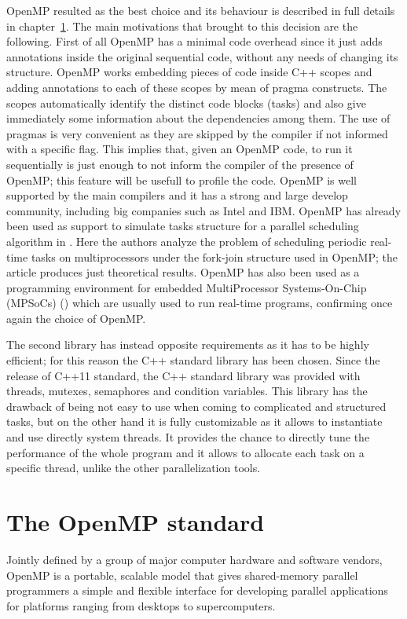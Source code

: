 \documentclass[a4paper,12pt,oneside]{book}
\begin{document}
OpenMP resulted as the best choice and its behaviour is described in full details in chapter~\ref{openmp}. The main motivations that brought to this decision are the following. First of all  OpenMP has a minimal code overhead since it just adds annotations inside the original sequential code, without any needs of changing its structure.  OpenMP works embedding pieces of code inside C++ scopes and adding annotations to each of these scopes by mean of pragma constructs. The scopes automatically identify the distinct code blocks (tasks) and also give immediately some information about the dependencies among them. The use of pragmas is very convenient as they are skipped by the compiler if not informed with a specific flag. This implies that, given an  OpenMP code, to run it sequentially is just enough to not inform the compiler of the presence of  OpenMP; this feature will be usefull to profile the code.  OpenMP is well supported by the main compilers and it has a strong and large develop community, including big companies such as Intel and IBM. OpenMP has already been used as support to simulate tasks structure for a parallel scheduling algorithm in \cite{realtimeopenmp}. Here the authors analyze the problem of scheduling periodic real-time tasks on multiprocessors under the fork-join structure used in OpenMP; the article produces just theoretical results. OpenMP has also been used as a programming environment for embedded MultiProcessor Systems-On-Chip (MPSoCs) (\cite{benini}) which are usually used to run real-time programs, confirming once again the choice of OpenMP. 

The second library has instead opposite requirements as it has to be highly efficient; for this reason the C++ standard library has been chosen. Since the release of C++11 standard, the C++ standard library was provided with threads, mutexes, semaphores and condition variables. This library has the drawback of being not easy to use when coming to complicated and structured tasks, but on the other hand it is fully customizable as it allows to instantiate and use directly system threads. It provides the chance to directly tune the performance of the whole program and it allows to allocate each task on a specific thread, unlike the other parallelization tools.

\section{The OpenMP standard}
\label{openmp}

Jointly defined by a group of major computer hardware and software vendors, OpenMP is a portable, scalable model that gives shared-memory parallel programmers a simple and flexible interface for developing parallel applications for platforms ranging from desktops to supercomputers.
\end{document}

